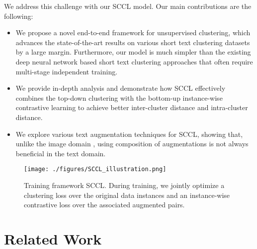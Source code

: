 \documentclass[11pt]{article}
\begin{document}
We address this challenge with our SCCL model. Our main contributions are the following:
\begin{itemize}
        \item We propose a novel end-to-end framework for unsupervised clustering, which advances the state-of-the-art results on various short text clustering datasets by a large margin. Furthermore, our model is much simpler than the existing deep neural network based short text clustering approaches that often require multi-stage independent training.  
\item We provide in-depth analysis and demonstrate how SCCL effectively combines the top-down clustering with the bottom-up instance-wise contrastive learning to achieve better inter-cluster distance and intra-cluster distance.
    \item We explore various text augmentation techniques for SCCL, showing that, unlike the image domain \citep{chen2020simple}, using composition of augmentations is not always beneficial in the text domain. 
\end{itemize}

\begin{figure*}[htbp]
    \centering
    \texttt{[image: ./figures/SCCL\_illustration.png]}
    \caption{Training framework SCCL. During training, we jointly optimize a clustering loss over the original data instances and an instance-wise contrastive loss over the associated augmented pairs. }
    \label{fig:model}
\end{figure*}

\section{Related Work}
\end{document}
